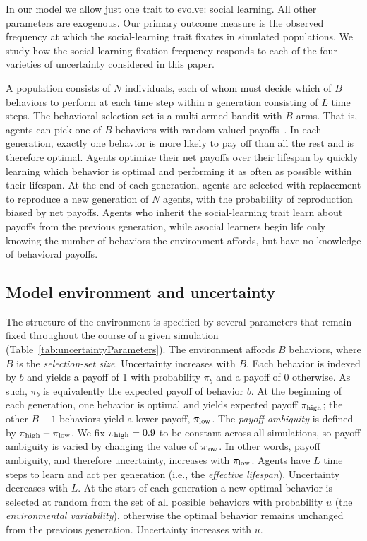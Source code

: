 \documentclass[letterpaper,11.5pt]{scrartcl}
\begin{document}
In our model we allow just one trait to evolve: social learning. All other parameters are exogenous. Our primary outcome measure is the observed frequency at which the social-learning trait fixates in simulated populations. We study how the social learning fixation frequency responds to each of the four varieties of uncertainty considered in this paper. 

A population consists of $N$ individuals, each of whom must decide which of $B$ behaviors to perform at
each time step within a generation consisting of $L$ time steps. The behavioral selection set is a multi-armed bandit with $B$ arms. That is, agents can pick one of $B$ behaviors with random-valued payoffs~\citep{SuttonBartoBook,McElreath2005,Steyvers2009,Rendell2010,Schulz2019}. In each generation, exactly one behavior is more likely to pay off than all the rest and is therefore optimal. Agents optimize their net payoffs over their lifespan by quickly learning which behavior is optimal and performing it as often as possible within their lifespan. At the end of each generation, agents are selected with replacement to reproduce a new generation of $N$ agents, with the probability of reproduction biased by net payoffs. Agents who inherit the social-learning trait learn about payoffs from the previous generation, while asocial learners begin life only knowing the number of behaviors the environment affords, but have no knowledge of behavioral payoffs.


\subsection{Model environment and uncertainty}

The structure of the environment is specified by several parameters that remain fixed throughout the course of a given simulation (Table~\ref{tab:uncertaintyParameters}).  The environment affords $B$ behaviors, where $B$ is the \emph{selection-set size}. Uncertainty increases with $B$. Each behavior is indexed by $b$ and yields a payoff of 1 with probability $\pi_b$ and a payoff of 0 otherwise. As such, $\pi_b$ is equivalently the expected payoff of behavior $b$. At the beginning of each generation, one behavior is optimal and yields expected payoff $\pi_{\mathrm{high}}$; the other $B-1$ behaviors yield a lower payoff, $\pi_{\mathrm{low}}$. The \emph{payoff ambiguity} is defined by $\pi_{\mathrm{high}} - \pi_{\mathrm{low}}$. We fix $\pi_{\mathrm{high}} = 0.9$ to be constant across all simulations, so payoff ambiguity is varied by changing the value of $\pi_{\mathrm{low}}$. In other words, payoff ambiguity, and therefore uncertainty, increases with $\pi_{\mathrm{low}}$.  Agents have $L$ time steps to learn and act per generation (i.e., the \emph{effective lifespan}). Uncertainty decreases with $L$. At the start of each generation a new optimal behavior is selected at random from the set of all possible behaviors with probability $u$ (the \emph{environmental variability}), otherwise the optimal behavior remains unchanged from the previous generation. Uncertainty increases with $u$.
\end{document}
